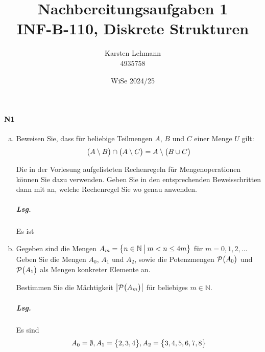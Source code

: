 \documentclass{scrreprt}
\author{Karsten Lehmann \\ 4935758}
\date{WiSe 2024/25}
\title{Nachbereitungsaufgaben 1\\INF-B-110, Diskrete Strukturen}
\begin{document}
\paragraph{N1}
\begin{enumerate}[(a)]
\item Beweisen Sie, dass für beliebige Teilmengen $A$, $B$ und $C$ einer Menge
  $U$ gilt:
  \[
    \qty\big(A \setminus B) \cap \qty\big(A \setminus C) = A \setminus \qty\big(B \cup C)
  \]

  Die in der Vorlesung aufgelisteten Rechenregeln für Mengenoperationen können
  Sie dazu verwenden.
  Geben Sie in den entsprechenden Beweisschritten dann mit an, welche Rechenregel
  Sie wo genau anwenden.

  \subparagraph{Lsg.} Es ist

\item Gegeben sind die Mengen
  $A_m = \qty\big{n \in \mathbb{N} \:{\big |}\: m < n \leq 4m}$
  für $m = 0, 1, 2, \ldots$
  Geben Sie die Mengen $A_0$, $A_1$ und $A_2$, sowie die Potenzmengen
  $\mathcal{P}\qty\big(A_0)$ und $\mathcal{P}\qty\big(A_1)$ als Mengen
  konkreter Elemente an.

  Bestimmen Sie die Mächtigkeit $\abs{\mathcal{P}\qty\big(A_m)}$ für
  beliebiges $m \in \mathbb{N}$.

  \subparagraph{Lsg.} Es sind
  \[
    A_0 = \emptyset,
    A_1 = \qty\big{2, 3, 4},
    A_2 = \qty\big{3, 4, 5, 6, 7, 8}
  \]


\end{enumerate}
\end{document}
